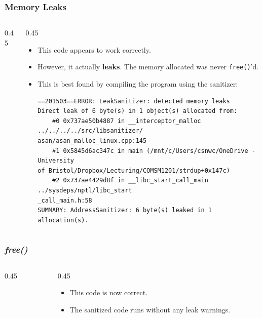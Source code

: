 \begin{frame}[fragile]
\frametitle{Memory Leaks}
\begin{columns}[T]

\begin{column}{0.45\textwidth}

\end{column}

\pause
\begin{column}{0.45\textwidth}
\begin{itemize}[<+->]
\item This code appears to work correctly.
\item However, it actually {\bf leaks}. The memory
allocated was never \verb^free()^'d.
\item This is best found by compiling the program using the sanitizer:
{\tiny
\begin{verbatim}
==201503==ERROR: LeakSanitizer: detected memory leaks
Direct leak of 6 byte(s) in 1 object(s) allocated from:
    #0 0x737ae50b4887 in __interceptor_malloc ../../../../src/libsanitizer/
asan/asan_malloc_linux.cpp:145
    #1 0x5845d6ac347c in main (/mnt/c/Users/csnwc/OneDrive - University
of Bristol/Dropbox/Lecturing/COMSM1201/strdup+0x147c)
    #2 0x737ae4429d8f in __libc_start_call_main ../sysdeps/nptl/libc_start
_call_main.h:58
SUMMARY: AddressSanitizer: 6 byte(s) leaked in 1 allocation(s).
\end{verbatim}
}
\end{itemize}
\end{column}

\end{columns}
\end{frame}


\begin{frame}[fragile]
\frametitle{{\em free()}}
\begin{columns}[T]

\begin{column}{0.45\textwidth}

\end{column}

\pause
\begin{column}{0.45\textwidth}
\begin{itemize}[<+->]
\item This code is now correct.
\item The sanitized code runs without any leak warnings.
\end{itemize}
\end{column}

\end{columns}
\end{frame}


